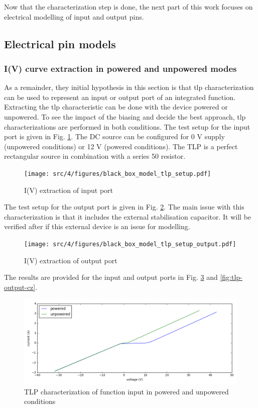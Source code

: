 Now that the characterization step is done, the next part of this work focuses on electrical modelling of input and output pins.

\subsection{Electrical pin models}
\subsubsection{I(V) curve extraction in powered and unpowered modes}

As a remainder, they initial hypothesis in this section is that \gls{tlp} characterization can be used to represent an input or output port of an integrated function.
Extracting the \gls{tlp} characteristic can be done with the device powered or unpowered.
To see the impact of the biasing and decide the best approach, \gls{tlp} characterizations are performed in both conditions.
The test setup for the input port is given in Fig. \ref{fig:tlp-input-testbench}.
The DC source can be configured for 0 V supply (unpowered conditions) or 12 V (powered conditions).
The TLP is a perfect rectangular source in combination with a series 50 \textOmega{} resistor.

\begin{figure}[!h]
  \centering
  \texttt{[image: src/4/figures/black\_box\_model\_tlp\_setup.pdf]}
  \caption{I(V) extraction of input port}
  \label{fig:tlp-input-testbench}
\end{figure}

The test setup for the output port is given in Fig. \ref{fig:tlp-output-testbench}.
The main issue with this characterization is that it includes the external stabilisation capacitor.
It will be verified after if this external device is an issue for modelling.

\begin{figure}[!h]
  \centering
  \texttt{[image: src/4/figures/black\_box\_model\_tlp\_setup\_output.pdf]}
  \caption{I(V) extraction of output port}
  \label{fig:tlp-output-testbench}
\end{figure}

The results are provided for the input and output ports in Fig. \ref{fig:tlp-input-cz} and \ref{fig:tlp-output-cz}.

\begin{figure}[!h]
  \centering
  \includegraphics[width=\textwidth]{src/4/figures/tlp_input_characterization.png}
  \caption{TLP characterization of function input in powered and unpowered conditions}
  \label{fig:tlp-input-cz}
\end{figure}

